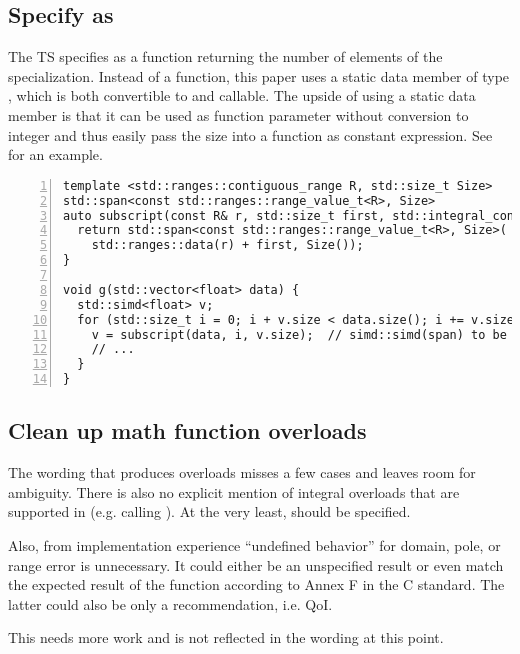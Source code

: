 \subsection{Specify  as }
The TS specifies  as a  function returning the number of elements of the  specialization.
Instead of a function, this paper uses a static data member of type , which is both convertible to  and callable.
The upside of using a static data member is that it can be used as function parameter without conversion to integer and thus easily pass the size into a function as constant expression.
See  for an example.
\begin{lstlisting}[numbers=left,float={hbtp},label=lst:sizeparam,caption={
    Example: Pass \code{simd::size} as ``constant expression function argument''
}]
template <std::ranges::contiguous_range R, std::size_t Size>
std::span<const std::ranges::range_value_t<R>, Size>
auto subscript(const R& r, std::size_t first, std::integral_constant<std::size_t, Size>) {
  return std::span<const std::ranges::range_value_t<R>, Size>(
    std::ranges::data(r) + first, Size());
}

void g(std::vector<float> data) {
  std::simd<float> v;
  for (std::size_t i = 0; i + v.size < data.size(); i += v.size) {
    v = subscript(data, i, v.size);  // simd::simd(span) to be proposed
    // ...
  }
}
\end{lstlisting}


\subsection{Clean up math function overloads}
The wording that produces  overloads misses a few cases and leaves room for ambiguity.
There is also no explicit mention of integral overloads that are supported in  (e.g.  calling ).
At the very least,  should be specified.

Also, from implementation experience ``undefined behavior'' for domain, pole, or range error is unnecessary.
It could either be an unspecified result or even match the expected result of the function according to Annex F in the C standard.
The latter could also be only a recommendation, i.e. QoI.

This needs more work and is not reflected in the wording at this point.


